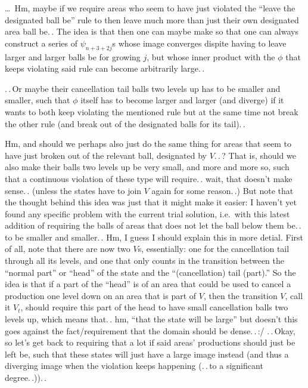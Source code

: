 \documentclass{report}
\begin{document}

\ldots\ Hm, maybe if we require areas who seem to have just violated the ``leave the designated ball be'' rule to then leave much more than just their own designated area ball be.\,. The idea is that then one can maybe make so that one can always construct a series of $\psi_{n+3+2j}$s whose image converges dispite having to leave larger and larger balls be for growing $j$, but whose inner product with the $\phi$ that keeps violating said rule can become arbitrarily large.\,. %

.\,.\,Or maybe their cancellation tail balls two levels up has to be smaller and smaller, such that $\phi$ itself has to become larger and larger (and diverge) if it wants to both keep violating the mentioned rule but at the same time not break the other rule (and break out of the designated balls for its tail).\,. %

Hm, and should we perhaps also just do the same thing for areas that seem to have just broken out of the relevant ball, designated by $V$.\,.\,? That is, should we also make their balls two levels up be very small, and more and more so, such that a continuous violation of these type will require.\,. wait, that doesn't make sense.\,. (unless the states have to join $V$ again for some reason.\,.) But note that the thought behind this idea was just that it might make it easier: I haven't yet found any specific problem with the current trial solution, i.e.\ with this latest addition of requiring the balls of areas that does not let the ball below them be.\,. to be smaller and smaller.\,. Hm, I guess I should explain this in more detial. First of all, note that there are now two $V$s, essentially: one for the cancellation tail through all its levels, and one that only counts in the transition between the ``normal part'' or ``head'' of the state and the ``(cancellation) tail (part).'' So the idea is that if a part of the ``head'' is of an area that could be used to cancel a production one level down on an area that is part of $V$, then the transition $V$, call it $V_t$, should require this part of the head to have small cancellation balls two levels up, which means that.\,. hm, ``that the state will be large'' but doesn't this goes against the fact/requirement that the domain should be dense.\,.\,:/ .\,.\,Okay, so let's get back to requiring that a lot if said areas' productions should just be left be, such that these states will just have a large image instead %
(and thus a diverging image when the violation keeps happening (.\,.\,to a significant degree.\,.)).\,. 
\end{document}
